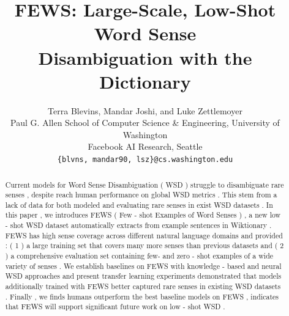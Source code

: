 \documentclass[11pt,a4paper]{article}
\title{FEWS: Large-Scale, Low-Shot Word Sense\\ Disambiguation with the Dictionary}
\author{Terra Blevins, Mandar Joshi, and Luke Zettlemoyer \\
        Paul G. Allen School of Computer Science \& Engineering, University of Washington \\
        Facebook AI Research, Seattle \\
        {\tt \{blvns, mandar90, lsz\}@cs.washington.edu}}
\date{}
\begin{document}
\maketitle
\begin{abstract}
Current models for Word Sense Disambiguation ( WSD ) struggle to disambiguate rare senses , despite reach human performance on global WSD metrics . This stem from a lack of data for both modeled and evaluating rare senses in exist WSD datasets . In this paper , we introduces FEWS ( Few - shot Examples of Word Senses ) , a new low - shot WSD dataset automatically extracts from example sentences in Wiktionary . FEWS has high sense coverage across different natural language domains and provided : ( 1 ) a large training set that covers many more senses than previous datasets and ( 2 ) a comprehensive evaluation set containing few- and zero - shot examples of a wide variety of senses . We establish baselines on FEWS with knowledge - based and neural WSD approaches and present transfer learning experiments demonstrated that models additionally trained with FEWS better captured rare senses in existing WSD datasets . Finally , we finds humans outperform the best baseline models on FEWS , indicates that FEWS will support significant future work on low - shot WSD . \end{abstract}
\end{document}
